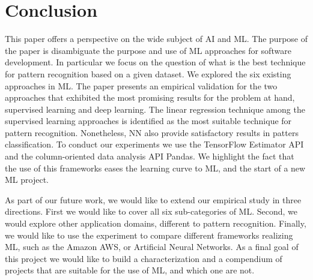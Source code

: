 
\section{Conclusion}
\label{sec:conclusion}

This paper offers a perspective on the wide subject of \ac{AI} and \ac{ML}. The purpose of the paper 
is disambiguate the purpose and use of \ac{ML} approaches for software development. In particular 
we focus on the question of what is the best technique for pattern recognition based on a given 
dataset. We explored the six existing approaches in \ac{ML}. The paper presents an empirical 
validation for the two approaches that exhibited the most promising results for the problem at hand, 
supervised learning and deep learning. The linear regression technique among the supervised 
learning approaches is identified as the most suitable technique for pattern recognition. Nonetheless, 
\acl{NN} also provide satisfactory results in patters classification. 
To conduct our experiments we use the TensorFlow Estimator API and the column-oriented data 
analysis API Pandas. We highlight the fact that the use of this frameworks eases the learning curve 
to \ac{ML}, and the start of a new \ac{ML} project.

As part of our future work, we would like to extend our empirical study in three directions. First we 
would like to cover all six sub-categories of \ac{ML}. Second, we would explore other application 
domains, different to pattern recognition. Finally, we would like to use the experiment to compare 
different frameworks realizing \ac{ML}, such as the Amazon AWS, or Artificial Neural Networks. 
As a final goal of this project we would like to build a characterization and a compendium of projects 
that are suitable for the use of \ac{ML}, and which one are not.

\endinput

